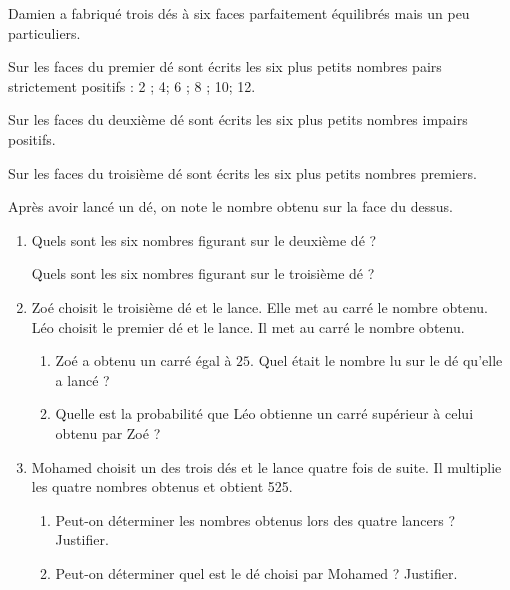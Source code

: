 
\medskip

Damien a fabriqué trois dés à six faces parfaitement équilibrés mais un peu particuliers.

Sur les faces du premier dé sont écrits les six plus petits nombres pairs strictement positifs : 2 ; 4; 6 ; 8 ; 10; 12.

Sur les faces du deuxième dé sont écrits les six plus petits nombres impairs positifs.

Sur les faces du troisième dé sont écrits les six plus petits nombres premiers.

Après avoir lancé un dé, on note le nombre obtenu sur la face du dessus.

\medskip

\begin{enumerate}
\item Quels sont les six nombres figurant sur le deuxième dé ? 

Quels sont les six nombres figurant sur le troisième dé ?
\item  Zoé choisit le troisième dé et le lance. Elle met au carré le nombre obtenu.
Léo choisit le premier dé et le lance. Il met au carré le nombre obtenu.
	\begin{enumerate}
		\item Zoé a obtenu un carré égal à $25$. Quel était le nombre lu sur le dé qu'elle a lancé ?
		\item Quelle est la probabilité que Léo obtienne un carré supérieur à celui obtenu par Zoé ?
 	\end{enumerate}
\item  Mohamed choisit un des trois dés et le lance quatre fois de suite. Il multiplie les quatre nombres obtenus et obtient 525.
	\begin{enumerate}
		\item Peut-on déterminer les nombres obtenus lors des quatre lancers ? Justifier.
		\item Peut-on déterminer quel est le dé choisi par Mohamed ? Justifier.
 	\end{enumerate}
\end{enumerate}

\bigskip

